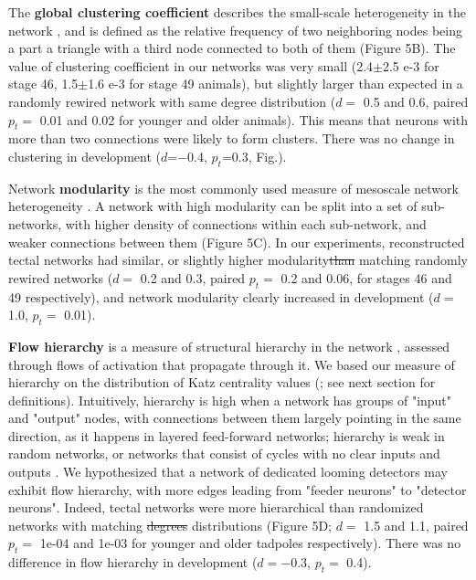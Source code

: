 \documentclass{article}
\providecommand{\DIFaddtex}[1]{{\protect\color{blue}{#1}}} %
\providecommand{\DIFdeltex}[1]{{\protect\color{red}\sout{#1}}}                      %
\providecommand{\DIFaddbegin}{} %
\providecommand{\DIFaddend}{} %
\providecommand{\DIFdelbegin}{} %
\providecommand{\DIFdelend}{} %
\providecommand{\DIFadd}[1]{\texorpdfstring{\DIFaddtex{#1}}{#1}} %
\providecommand{\DIFdel}[1]{\texorpdfstring{\DIFdeltex{#1}}{}} %
\newcommand{\DIFscaledelfig}{0.5}
\newlength{\DIFdelgraphicswidth} %
\newlength{\DIFdelgraphicsheight} %
\newcommand{\DIFaddincludegraphics}[2][]{{\color{blue}\fbox{\DIFOincludegraphics[#1]{#2}}}} %
\newcommand{\DIFdelincludegraphics}[2][]{%
\sbox{\DIFdelgraphicsbox}{\DIFOincludegraphics[#1]{#2}}%
\settoboxwidth{\DIFdelgraphicswidth}{\DIFdelgraphicsbox} %
\settoboxtotalheight{\DIFdelgraphicsheight}{\DIFdelgraphicsbox} %
\scalebox{\DIFscaledelfig}{%
\parbox[b]{\DIFdelgraphicswidth}{\usebox{\DIFdelgraphicsbox}\\[-\baselineskip] \rule{\DIFdelgraphicswidth}{0em}}\llap{\resizebox{\DIFdelgraphicswidth}{\DIFdelgraphicsheight}{%
\setlength{\unitlength}{\DIFdelgraphicswidth}%
\begin{picture}(1,1)%
\thicklines\linethickness{2pt} %
{\color[rgb]{1,0,0}\put(0,0){\framebox(1,1){}}}%
{\color[rgb]{1,0,0}\put(0,0){\line( 1,1){1}}}%
{\color[rgb]{1,0,0}\put(0,1){\line(1,-1){1}}}%
\end{picture}%
}\hspace*{3pt}}} %
} %
\DeclareRobustCommand{\DIFaddbegin}{\DIFOaddbegin \let\includegraphics\DIFaddincludegraphics} %
\DeclareRobustCommand{\DIFaddend}{\DIFOaddend \let\includegraphics\DIFOincludegraphics} %
\DeclareRobustCommand{\DIFdelbegin}{\DIFOdelbegin \let\includegraphics\DIFdelincludegraphics} %
\DeclareRobustCommand{\DIFdelend}{\DIFOaddend \let\includegraphics\DIFOincludegraphics} %
\begin{document}
The \textbf{global clustering coefficient} describes the small-scale heterogeneity in the network \citep{fagiolo2007}, and is defined as the relative frequency of two neighboring nodes being a part a triangle with a third node connected to both of them (Figure 5B). The value of clustering coefficient in our networks was very small (2.4$\pm$2.5 e-3 for stage 46, 1.5$\pm$1.6 e-3 for stage 49 animals), but slightly larger than expected in a randomly rewired network with same degree distribution ($d=$ 0.5 and 0.6, paired $p_t=$ 0.01 and 0.02 for younger and older animals). This means that neurons with more than two connections were likely to form clusters. There was no change in clustering in development ($d$=$-$0.4, $p_t$=0.3, Fig.).

Network \textbf{modularity} is the most commonly used measure of mesoscale network heterogeneity \citep{newman2006modularity, leicht2008community}. A network with high modularity can be split into a set of sub-networks, with higher density of connections within each sub-network, and weaker connections between them (Figure 5C). In our experiments, reconstructed tectal networks had similar, or slightly higher modularity\DIFdelbegin \DIFdel{than }\DIFdelend \DIFaddbegin \DIFadd{, compared to }\DIFaddend matching randomly rewired networks ($d=$ 0.2 and 0.3, paired $p_t=$ 0.2 and 0.06, for stages 46 and 49 respectively), and network modularity clearly increased in development ($d=$ 1.0, $p_t =$ 0.01).

\textbf{Flow hierarchy} is a measure of structural hierarchy in the network \citep{mones2012hierarchy}, assessed through flows of activation that propagate through it. We based our measure of hierarchy on the distribution of Katz centrality values (\citealt{katz1953original, fletcher2018katz}; see next section for definitions). Intuitively, hierarchy is high when a network has groups of "input" and "output" nodes, with connections between them largely pointing in the same direction, as it happens in layered feed-forward networks; hierarchy is weak in random networks, or networks that consist of cycles with no clear inputs and outputs \citep{czegel2015hierarchy}. We hypothesized that a network of dedicated looming detectors may exhibit flow hierarchy, with more edges leading from "feeder neurons" to "detector neurons". Indeed, tectal networks were more hierarchical than randomized networks with matching \DIFdelbegin \DIFdel{degrees }\DIFdelend \DIFaddbegin \DIFadd{degree }\DIFaddend distributions (Figure 5D; $d=$ 1.5 and 1.1, paired $p_t=$ 1e-04 and 1e-03 for younger and older tadpoles respectively). There was no difference in flow hierarchy in development ($d=-$0.3, $p_t=$ 0.4).
\end{document}
